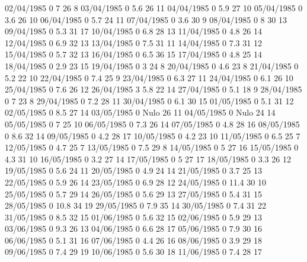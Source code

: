 02/04/1985  0      7      26     8 
03/04/1985  0      5.6    26     11 
04/04/1985  0      5.9    27     10 
05/04/1985  0      3.6    26     10 
06/04/1985  0      5.7    24     11 
07/04/1985  0      3.6    30     9 
08/04/1985  0      8      30     13 
09/04/1985  0      5.3    31     17 
10/04/1985  0      6.8    28     13 
11/04/1985  0      4.8    26     14 
12/04/1985  0      6.9    32     13 
13/04/1985  0      7.5    31     11 
14/04/1985  0      7.3    31     12 
15/04/1985  0      5.7    32     13 
16/04/1985  0      6.5    36     15 
17/04/1985  0      4.8    25     14 
18/04/1985  0      2.9    23     15 
19/04/1985  0      3      24     8 
20/04/1985  0      4.6    23     8 
21/04/1985  0      5.2    22     10 
22/04/1985  0      7.4    25     9 
23/04/1985  0      6.3    27     11 
24/04/1985  0      6.1    26     10 
25/04/1985  0      7.6    26     12 
26/04/1985  3      5.8    22     14 
27/04/1985  0      5.1    18     9 
28/04/1985  0      7      23     8 
29/04/1985  0      7.2    28     11 
30/04/1985  0      6.1    30     15 
01/05/1985  0      5.1    31     12 
02/05/1985  0      8.5    27     14 
03/05/1985  0     Nulo    26     11 
04/05/1985  0     Nulo    24     14 
05/05/1985  0      7      25     10 
06/05/1985  0      7.3    26     14 
07/05/1985  0      4.8    28     16 
08/05/1985  0      8.6    32     14 
09/05/1985  0      4.2    28     17 
10/05/1985  0      4.2    23     10 
11/05/1985  0      6.5    25     7 
12/05/1985  0      4.7    25     7 
13/05/1985  0      7.5    29     8 
14/05/1985  0      5      27     16 
15/05/1985  0      4.3    31     10 
16/05/1985  0      3.2    27     14 
17/05/1985  0      5      27     17 
18/05/1985  0      3.3    26     12 
19/05/1985  0      5.6    24     11 
20/05/1985  0      4.9    24     14 
21/05/1985  0      3.7    25     13 
22/05/1985  0      5.9    26     14 
23/05/1985  0      6.9    28     12 
24/05/1985  0      11.4   30     10 
25/05/1985  0      5.7    29     14 
26/05/1985  0      5.6    29     13 
27/05/1985  0      5.4    31     15 
28/05/1985  0      10.8   34     19 
29/05/1985  0      7.9    35     14 
30/05/1985  0      7.4    31     22 
31/05/1985  0      8.5    32     15 
01/06/1985  0      5.6    32     15 
02/06/1985  0      5.9    29     13 
03/06/1985  0      9.3    26     13 
04/06/1985  0      6.6    28     17 
05/06/1985  0      7.9    30     16 
06/06/1985  0      5.1    31     16 
07/06/1985  0      4.4    26     16 
08/06/1985  0      3.9    29     18 
09/06/1985  0      7.4    29     19 
10/06/1985  0      5.6    30     18 
11/06/1985  0      7.4    28     17 
